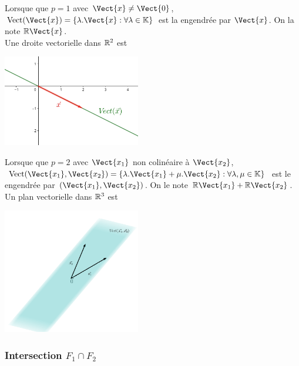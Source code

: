 \documentclass{book}
\begin{document}
\begin{Exemple}
Lorsque que $p=1$ avec $ \Vect{x} \neq \Vect{0}$, $\Vectt(\Vect{x}) = \{\lambda .\Vect{x} : \forall \lambda  \in  \K  \}$
est la  engendrée par $\Vect{x}$. On la note $\R \Vect{x}$.\\
Une droite vectorielle dans $\mathbb{R} ^2$ est 
\begin{center}
\includegraphics[width=6cm]{espace_vectoriel_droite.png}
\end{center}
\end{Exemple}
\begin{Exemple}
Lorsque que $p=2$ avec $ \Vect{x_1}$ non colinéaire à $\Vect{x_2}$, $\Vectt (\Vect{x_1},\Vect{x_2}) = \{\lambda .\Vect{x_1}+\mu.\Vect{x_2} : \forall \lambda ,\mu \in  \K  \}$
est le  engendrée par $(\Vect{x_1},\Vect{x_2})$. On le note $\R \Vect{x_1}+\R \Vect{x_2}$.\\
Un plan vectorielle dans $\mathbb{R} ^3$  est 
\begin{center}
\includegraphics[width=6cm]{espace_vectoriel_plan.png}
\end{center}
\end{Exemple}
\subsubsection{Intersection $F_1\cap F_2$}
\end{document}
